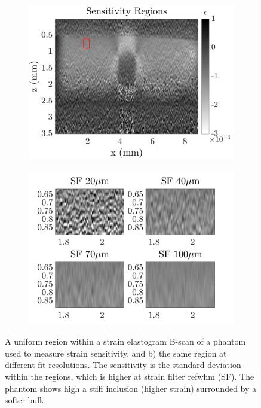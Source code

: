 \begin{figure}	
	\centering
	\begin{subfigure}{0.49\textwidth}
		\centering
		\includegraphics[width=\textwidth]{strainreview_figs/sensitivity_regions.png}
	\end{subfigure}
	\begin{subfigure}{0.49\textwidth}
		\centering
		\includegraphics[width=\textwidth]{strainreview_figs/regions_zoomed.png}
	\end{subfigure}
	\caption{A uniform region within a strain elastogram B-scan of a phantom used to measure strain sensitivity, and b) the same region at different fit resolutions. The sensitivity is the standard deviation within the regions, which is higher at strain filter re\ac{fwhm} (SF). The phantom shows high a stiff inclusion (higher strain) surrounded by a softer bulk.}
	\label{sensitivity_region}
\end{figure}

